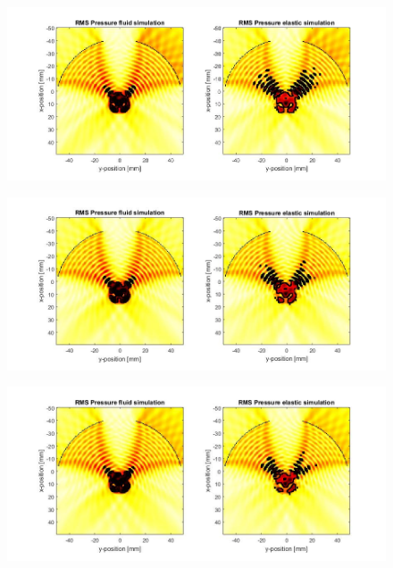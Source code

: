 \documentclass[10pt,a4paper]{article}
\begin{document}
\begin{figure}[H]\label{comp_260kHz}
\hspace*{-4cm}                                                    
\includegraphics[scale=0.6]{comp_260kHz}
\end{figure}
\begin{figure}[H]\label{comp_270kHz}
\hspace*{-4cm}                                                    
\includegraphics[scale=0.6]{comp_270kHz}
\end{figure}
\begin{figure}[H]\label{comp_280kHz}
\hspace*{-4cm}                                                    
\includegraphics[scale=0.6]{comp_280kHz}
\end{figure}
\end{document}
